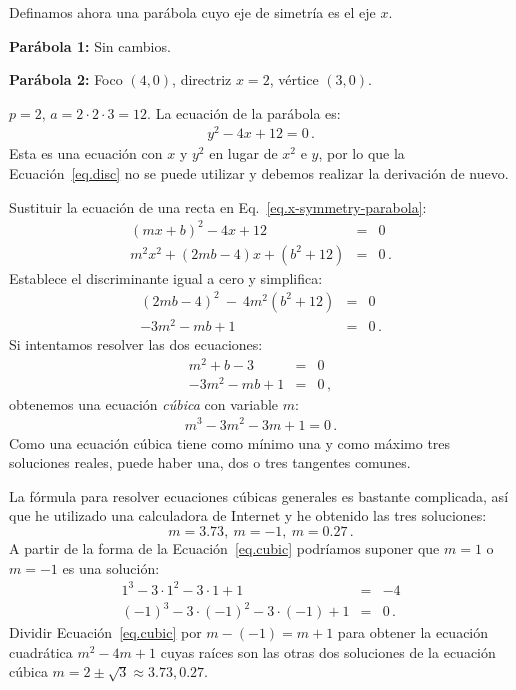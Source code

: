 \begin{example}\mbox{}

\noindent Definamos ahora una parábola cuyo eje de simetría es el eje $x$.

\noindent\textbf{Parábola 1:} Sin cambios. 

\noindent\textbf{Parábola 2:} Foco $(4,0)$, directriz $x=2$, vértice $(3,0)$.

\noindent{}$p=2$, $a=2\cdot 2\cdot 3=12$. La ecuación de la parábola es:
\begin{align}
y^2-4x+12 = 0\,.\label{eq.x-symmetry-parabola}
\end{align}
Esta es una ecuación con $x$ y $y^2$ en lugar de $x^2$ e $y$, por lo que la Ecuación~\ref{eq.disc} no se puede utilizar y debemos realizar la derivación de nuevo.

Sustituir la ecuación de una recta en Eq.~\ref{eq.x-symmetry-parabola}:
\begin{eqnarray*}
(mx+b)^2-4x+12&=&0\\
m^2x^2+(2mb-4)x+(b^2+12)&=&0\,.
\end{eqnarray*}
Establece el discriminante igual a cero y simplifica:
\begin{eqnarray*}
(2mb-4)^2\:-\:4m^2(b^2+12)&=&0\\
-3m^2-mb+1&=&0\,.
\end{eqnarray*}
Si intentamos resolver las dos ecuaciones:
\begin{eqnarray*}
m^2+b-3&=&0\\
-3m^2-mb+1&=&0\,,
\end{eqnarray*}
obtenemos una ecuación \emph{cúbica} con variable $m$:
\begin{align}
m^3-3m^2-3m+1=0\,.\label{eq.cubic}
\end{align}
Como una ecuación cúbica tiene como mínimo una y como máximo tres soluciones reales, puede haber una, dos o tres tangentes comunes.

La fórmula para resolver ecuaciones cúbicas generales es bastante complicada, así que he utilizado una calculadora de Internet y he obtenido las tres soluciones:
\[m=3.73,\:m=-1,\:m=0.27\,.\]
A partir de la forma de la Ecuación~\ref {eq.cubic} podríamos suponer que $m=1$ o $m=-1$ es una solución:
\begin{eqnarray*}
1^3-3\cdot 1^2-3\cdot 1+1&=&-4\\
(-1)^3-3\cdot (-1)^2-3\cdot(-1)+1&=&0\,.
\end{eqnarray*}
Dividir Ecuación~\ref{eq.cubic} por $m-(-1)=m+1$ para obtener la ecuación cuadrática $m^2-4m+1$ cuyas raíces son las otras dos soluciones de la ecuación cúbica $m=2\pm\sqrt{3}\approx 3.73, 0.27$.
\end{example}

